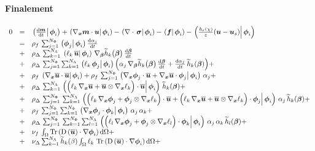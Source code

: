 \documentclass[10pt,a4paper]{article}
\begin{document}
\paragraph{Finalement}
%
\begin{equation}
\begin{array}{rcl}
0 &=&  \prodscal{\dt{\vec m}}{\vphi_i} +   \prodscal{\grad_{\vx}\vec m \cdot \vu }{\vphi_i} -\prodscal{\div \,\vsigma}{\vphi_i} - \prodscal{\vec f}{\vphi_i} - \prodscal{\frac{\he(\chi)}{\varepsilon}(\vu-\vu_{s})}{\vphi_i} \\
&=& \rho_f \, \sum_{j=1}^{N_\Phi} \prodscal{\vphi_j}{\vphi_i}\dt{\alpha_j} \\
&+& \rho_\Delta\,\sum_{k=1}^{N_\Lambda}\,  \prodscal{\ell_k \, \bu}{\vphi_i}\, \grad_{\vec \beta}\th_k \big(\vec \beta\big)\,\dt{\vec \beta}\\
&+& \rho_\Delta\,\sum_{j=1}^{N_\Phi} \sum_{k=1}^{N_\Lambda}  \prodscal{\ell_k\,\vphi_j}{\vphi_i} \Big(\alpha_j \,  \grad_{\vec \beta}\th_k \big(\vec \beta\big)\,\dt{\vec \beta}+ \dt{\alpha_j}\, \th_k(\vec \beta)\Big) + \\
&+& \rho_f \, \prodscal{\grad_{\vx}\bu \cdot \bu}{\vphi_i} + \rho_f \, \sum_{j=1}^{N_\Phi}  \prodscal{\grad_{\vx} \vphi_j\cdot \bu + \grad_{\vx}\bu\cdot \vphi_j }{\vphi_i}
\,\alpha_j  + \\
&+& \rho_\Delta\, \sum_{k=1}^{N_\Lambda}\prodscal{\Big( \ell_k \, \grad_{\vx}\bu+ \bu\otimes\grad_{\vx}\ell_k\Big)\cdot \bu}{\vphi_i}  \, \th_k (\vec \beta)  + \\
&+& \rho_\Delta\, \sum_{j=1}^{N_\Phi} \,\sum_{k=1}^{N_\Lambda} 
 \prodscal{\Big( \ell_k \, \grad_{\vx}\vphi_j+ \vphi_j \otimes\grad_{\vx}\ell_k\Big)\cdot \bu +  \Big( \ell_k \, \grad_{\vx}\bu+ \bu\otimes\grad_{\vx}\ell_k\Big) \cdot \vphi_j }{\vphi_i}\,\alpha_j \, \th_k (\vec \beta) + \\
&+&  \rho_f \, \sum_{j=1}^{N_\Phi} \sum_{k=1}^{N_\Phi}  \prodscal{ \grad_{\vx} \vphi_j\cdot \vphi_k }{\vphi_i}\,\alpha_j \,\alpha_k  + \\
&+& \rho_\Delta\, \sum_{j=1}^{N_\Phi} \,\sum_{k=1}^{N_\Phi} \sum_{l=1}^{N_\Lambda}
\prodscal{\Big( \ell_l \, \grad_{\vx}\vphi_j+ \vphi_j \otimes\grad_{\vx}\ell_l\Big)\cdot \vphi_k }{\vphi_i}\, \alpha_j \, \alpha_k \,\th_l (\vec \beta) + \\
&+& \nu_f\,\int_\Omega\trace{\D{\bu}\cdot\grad \vphi_i}\d\Omega + \\
&+& \nu_{\Delta}\sum_{k=1}^{N_\Lambda} \th_k(\beta) \int_\Omega\ell_k \, \trace{\D{\bu}\cdot\grad \vphi_i}\d\Omega + \\

\end{array}
\end{equation}
\end{document}
